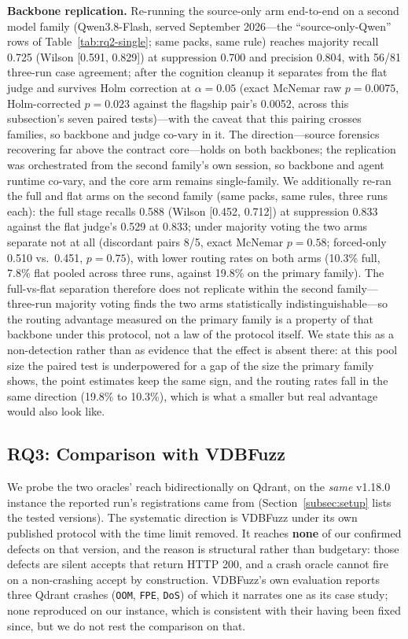 \documentclass[acmsmall,screen,review,anonymous]{acmart}
\begin{document}
\textbf{Backbone replication.}
Re-running the source-only arm end-to-end on a second model family (Qwen3.8-Flash, served September 2026---the ``source-only-Qwen'' rows of Table~\ref{tab:rq2-single}; same packs, same rule) reaches majority recall 0.725 (Wilson [0.591, 0.829]) at suppression 0.700 and precision 0.804, with 56/81 three-run case agreement; after the cognition cleanup it separates from the flat judge and survives Holm correction at $\alpha{=}0.05$ (exact McNemar raw $p{=}0.0075$, Holm-corrected $p{=}0.023$ against the flagship pair's 0.0052, across this subsection's seven paired tests)---with the caveat that this pairing crosses families, so backbone and judge co-vary in it. The direction---source forensics recovering far above the contract core---holds on both backbones; the replication was orchestrated from the second family's own session, so backbone and agent runtime co-vary, and the core arm remains single-family. We additionally re-ran the full and flat arms on the second family (same packs, same rules, three runs each): the full stage recalls 0.588 (Wilson [0.452, 0.712]) at suppression 0.833 against the flat judge's 0.529 at 0.833; under majority voting the two arms separate not at all (discordant pairs 8/5, exact McNemar $p{=}0.58$; forced-only 0.510 vs.\ 0.451, $p{=}0.75$), with lower routing rates on both arms (10.3\% full, 7.8\% flat pooled across three runs, against 19.8\% on the primary family). The full-vs-flat separation therefore does not replicate within the second family---three-run majority voting finds the two arms statistically indistinguishable---so the routing advantage measured on the primary family is a property of that backbone under this protocol, not a law of the protocol itself. We state this as a non-detection rather than as evidence that the effect is absent there: at this pool size the paired test is underpowered for a gap of the size the primary family shows, the point estimates keep the same sign, and the routing rates fall in the same direction (19.8\% to 10.3\%), which is what a smaller but real advantage would also look like.

\subsection{RQ3: Comparison with VDBFuzz}
\label{subsec:rq3}

We probe the two oracles' reach bidirectionally on Qdrant, on the \emph{same} v1.18.0 instance the reported run's registrations came from (Section~\ref{subsec:setup} lists the tested versions). The systematic direction is VDBFuzz under its own published protocol with the time limit removed. It reaches \textbf{none} of our confirmed defects on that version, and the reason is structural rather than budgetary: those defects are silent accepts that return HTTP 200, and a crash oracle cannot fire on a non-crashing accept by construction. VDBFuzz's own evaluation reports three Qdrant crashes (\texttt{OOM}, \texttt{FPE}, \texttt{DoS}) of which it narrates one as its case study; none reproduced on our instance, which is consistent with their having been fixed since, but we do not rest the comparison on that.
\end{document}
